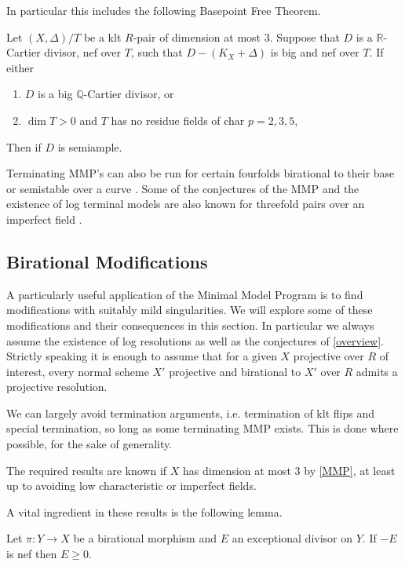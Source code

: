 In particular this includes the following Basepoint Free Theorem.

\begin{theorem}\label{bpt}
	Let $(X,\Delta)/T$ be a klt $R$-pair of dimension at most $3$. Suppose that $D$ is a $\mathbb{R}$-Cartier divisor, nef over $T$, such that $D-(K_{X}+\Delta)$ is big and nef over $T$. If either
	\begin{enumerate}
		\item $D$ is a big $\mathbb{Q}$-Cartier divisor, or
		\item $\dim T>0$ and $T$ has no residue fields of char $p=2,3,5$,
	\end{enumerate}
	Then if $D$ is semiample.
\end{theorem}

Terminating MMP's can also be run for certain fourfolds birational to their base or semistable over a curve \cite{hacon2020relative}. Some of the conjectures of the MMP and the existence of log terminal models are also known for threefold pairs over an imperfect field \cite{das2019log}. 


\subsection{Birational Modifications}

A particularly useful application of the Minimal Model Program is to find modifications with suitably mild singularities. We will explore some of these modifications and their consequences in this section. In particular we always assume the existence of log resolutions as well as the conjectures of \autoref{overview}. Strictly speaking it is enough to assume that for a given $X$ projective over $R$ of interest, every normal scheme $X'$ projective and birational to $X'$ over $R$ admits a projective resolution.

We can largely avoid termination arguments, i.e. termination of klt flips and special termination, so long as some terminating MMP exists. This is done where possible, for the sake of generality.

The required results are known if $X$ has dimension at most $3$ by \autoref{MMP}, at least up to avoiding low characteristic or imperfect fields.

A vital ingredient in these results is the following lemma.

\begin{lemma}\cite[Lemma 2.14]{bhatt2020}	
	Let $\pi:Y \to X$ be a birational morphism and $E$ an exceptional divisor on $Y$. If $-E$ is nef then $E \geq 0$.

	\end{lemma}

